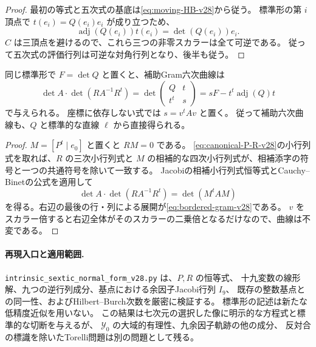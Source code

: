 \begin{proof}
最初の等式と五次式の基底は\eqref{eq:moving-HB-v28}から従う。
標準形の第 $i$ 頂点で $t(e_i)=Q(e_i)e_i$ が成り立つため、
\[
 \operatorname{adj}(Q(e_i))t(e_i)=\det(Q(e_i))e_i.
\]
$C$ は三頂点を避けるので、これら三つの非零スカラーは全て可逆である。
従って五次式の評価行列は可逆な対角行列となり、後半も従う。
\end{proof}

\begin{corollary}[補助六次曲線の直接式]
\label{cor:bordered-gram-v28}
同じ標準形で $F=\det Q$ と置くと、補助Gram六次曲線は
\begin{equation}\label{eq:bordered-gram-v28}
 \det A\cdot\det(RA^{-1}R^t)
 =\det\begin{pmatrix}Q&t\\t^t&s\end{pmatrix}
 =sF-t^t\operatorname{adj}(Q)t
\end{equation}
で与えられる。
座標に依存しない式では $s=v^tAv$ と置く。
従って補助六次曲線も、$Q$ と標準的な直線 $\ell$ から直接得られる。
\end{corollary}

\begin{proof}
$M=[P^t\mid e_0]$ と置くと $RM=0$ である。
\eqref{eq:canonical-P-R-v28}の小行列式を取れば、$R$ の三次小行列式と
$M$ の相補的な四次小行列式が、相補添字の符号と一つの共通符号を除いて一致する。
Jacobiの相補小行列式恒等式とCauchy--Binetの公式を適用して
\[
 \det A\cdot\det(RA^{-1}R^t)=\det(M^tAM)
\]
を得る。右辺の最後の行・列による展開が\eqref{eq:bordered-gram-v28}である。
$v$ をスカラー倍すると右辺全体がそのスカラーの二乗倍となるだけなので、曲線は不変である。
\end{proof}

\paragraph{再現入口と適用範囲.}
\nolinkurl{intrinsic_sextic_normal_form_v28.py} は、$P,R$ の恒等式、
十九変数の線形解、九つの逆行列成分、基点における余因子Jacobi行列 $I_9$、
既存の整数基点との同一性、およびHilbert--Burch次数を厳密に検証する。
標準形の記述は新たな低精度近似を用いない。
この結果は七次元の選択した像に明示的な方程式と標準的な切断を与えるが、
$\mathcal Y_0$ の大域的有理性、九余因子軌跡の他の成分、
反対合の標識を除いたTorelli問題は別の問題として残る。

